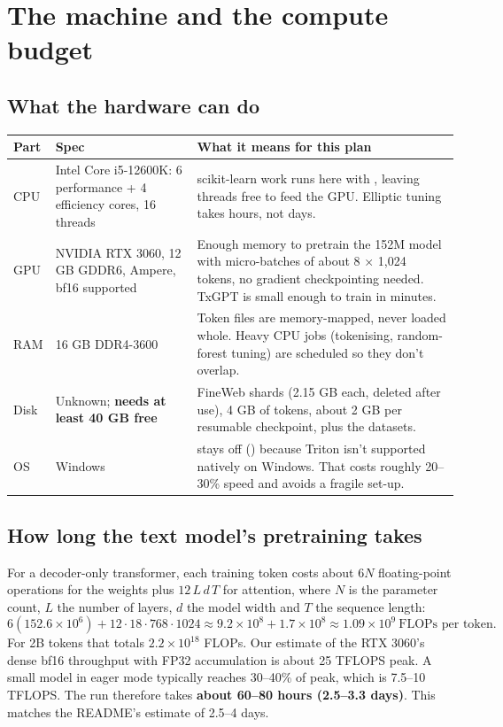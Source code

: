 \section{The machine and the compute budget}
\label{sec:compute}

\subsection{What the hardware can do}

\begin{center}
\small
\begin{tabularx}{\textwidth}{@{}L{3.2cm}L{4.4cm}Y@{}}
\toprule
\textbf{Part} & \textbf{Spec} & \textbf{What it means for this plan} \\
\midrule
CPU & Intel Core i5-12600K: 6 performance + 4 efficiency cores, 16 threads & scikit-learn work runs here with , leaving threads free to feed the GPU. Elliptic tuning takes hours, not days. \\
GPU & NVIDIA RTX 3060, 12 GB GDDR6, Ampere, bf16 supported & Enough memory to pretrain the 152M model with micro-batches of about 8 × 1,024 tokens, no gradient checkpointing needed\est{}. TxGPT is small enough to train in minutes. \\
RAM & 16 GB DDR4-3600 & Token files are memory-mapped, never loaded whole. Heavy CPU jobs (tokenising, random-forest tuning) are scheduled so they don't overlap. \\
Disk & Unknown; \textbf{needs at least 40 GB free} & FineWeb shards (2.15 GB each, deleted after use), 4 GB of tokens, about 2 GB per resumable checkpoint, plus the datasets. \\
OS & Windows &  stays off () because Triton isn't supported natively on Windows. That costs roughly 20--30\% speed\est{} and avoids a fragile set-up. \\
\bottomrule
\end{tabularx}
\end{center}

\subsection{How long the text model's pretraining takes}
\label{sec:flops}

For a decoder-only transformer, each training token costs about $6N$ floating-point operations for
the weights plus $12\,L\,d\,T$ for attention, where $N$ is the parameter count, $L$ the number of
layers, $d$ the model width and $T$ the sequence length:
\[
6(152.6\times10^{6}) + 12\cdot18\cdot768\cdot1024 \approx 9.2\times10^{8} + 1.7\times10^{8}
\approx 1.09\times10^{9}\ \text{FLOPs per token.}
\]
For 2B tokens that totals $2.2\times10^{18}$ FLOPs. Our estimate of the RTX 3060's dense bf16
throughput with FP32 accumulation is about 25 TFLOPS peak. A small model in eager mode typically
reaches 30--40\% of peak, which is 7.5--10 TFLOPS. The run therefore takes \textbf{about 60--80
hours (2.5--3.3 days)}\est{}. This matches the README's estimate of 2.5--4 days.


